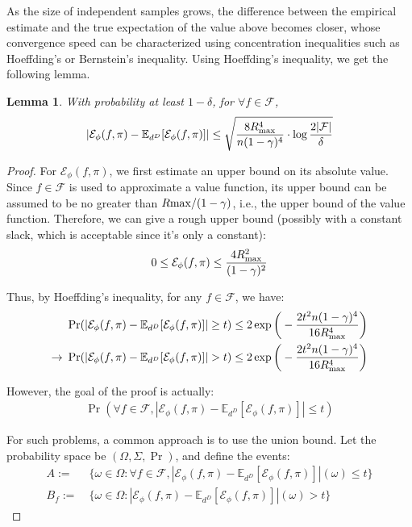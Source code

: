 \documentclass[twoside]{article}
\newtheorem{lemma}{Lemma}
\newcommand{\CAL}[1]{\mathcal{#1}}
\begin{document}
As the size of independent samples grows, the difference between the empirical estimate and the true expectation of the value above becomes closer, whose convergence speed can be characterized using concentration inequalities such as Hoeffding's or Bernstein's inequality. Using Hoeffding's inequality, we get the following lemma.
\begin{lemma}\label{lem:hoeffding_result}
    With probability at least $1-\delta$, for $\forall f\in\mathcal{F}$,
    \begin{align}
        |\mathcal{E}_\phi(f,\pi)-\mathbb{E}_{d^{D}}[\mathcal{E}_\phi(f,\pi)]|\leq\sqrt{\frac{8R_{\rm max}^4}{n(1-\gamma)^4}\cdot\log\frac{2|\mathcal{F}|}{\delta}}
    \end{align}
\end{lemma}
\begin{proof}
For $\CAL{E}_\phi(f,\pi)$, we first estimate an upper bound on its absolute value. Since $f \in \CAL{F}$ is used to approximate a value function, its upper bound can be assumed to be no greater than $R{\rm max}/(1 - \gamma)$, i.e., the upper bound of the value function. Therefore, we can give a rough upper bound (possibly with a constant slack, which is acceptable since it’s only a constant):
\begin{align*}
0\leq \CAL{E}_\phi(f,\pi)\leq \frac{4R_{\rm max}^2}{(1-\gamma)^2}
\end{align*}

Thus, by Hoeffding’s inequality, for any $f \in \CAL{F}$, we have:
\begin{align}
&\ \Pr(|\mathcal{E}_\phi(f,\pi)-\mathbb{E}_{d^{D}}[\mathcal{E}_\phi(f,\pi)]|\geq t)\leq 2\exp\bigg(-\frac{2t^2n(1-\gamma)^4}{16R_{\rm max}^4}\bigg)\nonumber\\
        \to&\ \Pr(|\mathcal{E}_\phi(f,\pi)-\mathbb{E}_{d^{D}}[\mathcal{E}_\phi(f,\pi)]|> t)\leq 2\exp\bigg(-\frac{2t^2n(1-\gamma)^4}{16R_{\rm max}^4}\bigg)\label{ineq:hoeffding_target}
\end{align}

However, the goal of the proof is actually:
\begin{align}\label{equ:hoeffding_target_ultimate}
\Pr(\forall f\in\CAL{F}, |\mathcal{E}_\phi(f,\pi)-\mathbb{E}_{d^{D}}[\mathcal{E}_\phi(f,\pi)]|\leq t)
\end{align}

For such problems, a common approach is to use the union bound. Let the probability space be $(\Omega, \Sigma, \Pr)$, and define the events:
\begin{align*}
A:=&\ \{\omega\in\Omega:\forall f\in\CAL{F},|\mathcal{E}_\phi(f,\pi)-\mathbb{E}_{d^{D}}[\mathcal{E}_\phi(f,\pi)]|(\omega)\leq t\}\\
        B_f:=&\ \{\omega\in\Omega: |\mathcal{E}_\phi(f,\pi)-\mathbb{E}_{d^{D}}[\mathcal{E}_\phi(f,\pi)]|(\omega)> t\}
\end{align*}


\end{proof}
\end{document}
